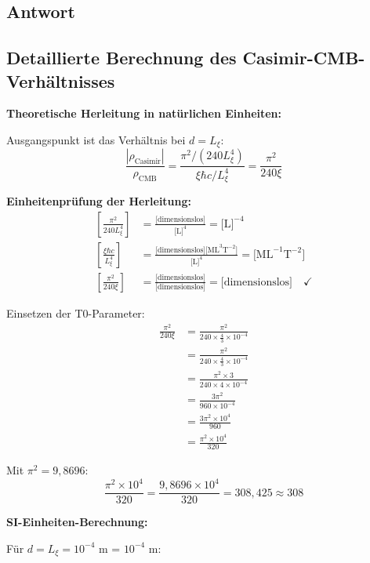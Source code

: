 \documentclass[12pt,a4paper]{article}
\theoremstyle{remark}
\newenvironment{answer}{\subsection*{Antwort}}{\vspace{1em}}
\begin{document}
\begin{answer}
	\subsection{Detaillierte Berechnung des Casimir-CMB-Verhältnisses}
	
	\textbf{Theoretische Herleitung in natürlichen Einheiten:}
	
	Ausgangspunkt ist das Verhältnis bei $d = L_\xi$:
	\begin{equation}
		\frac{|\rho_{\text{Casimir}}|}{\rho_{\text{CMB}}} = \frac{\pi^2/(240 L_\xi^4)}{\xi \hbar c/L_\xi^4} = \frac{\pi^2}{240 \xi}
	\end{equation}
	
	\begin{units}
		\textbf{Einheitenprüfung der Herleitung:}
		\begin{align}
			\left[\frac{\pi^2}{240 L_\xi^4}\right] &= \frac{\text{[dimensionslos]}}{\text{[L]}^4} = \text{[L]}^{-4} \\
			\left[\frac{\xi \hbar c}{L_\xi^4}\right] &= \frac{\text{[dimensionslos][ML}^3\text{T}^{-2}\text{]}}{\text{[L]}^4} = \text{[ML}^{-1}\text{T}^{-2}\text{]} \\
			\left[\frac{\pi^2}{240 \xi}\right] &= \frac{\text{[dimensionslos]}}{\text{[dimensionslos]}} = \text{[dimensionslos]} \quad \checkmark
		\end{align}
	\end{units}
	
	Einsetzen der T0-Parameter:
	\begin{align}
		\frac{\pi^2}{240 \xi} &= \frac{\pi^2}{240 \times \frac{4}{3} \times 10^{-4}} \\
		&= \frac{\pi^2}{240 \times \frac{4}{3} \times 10^{-4}} \\
		&= \frac{\pi^2 \times 3}{240 \times 4 \times 10^{-4}} \\
		&= \frac{3\pi^2}{960 \times 10^{-4}} \\
		&= \frac{3\pi^2 \times 10^4}{960} \\
		&= \frac{\pi^2 \times 10^4}{320}
	\end{align}
	
	Mit $\pi^2 = 9{,}8696$:
	\begin{equation}
		\frac{\pi^2 \times 10^4}{320} = \frac{9{,}8696 \times 10^4}{320} = 308{,}425 \approx 308
	\end{equation}
	
	\textbf{SI-Einheiten-Berechnung:}
	
	Für $d = L_\xi = 10^{-4}$ m = $10^{-4}$ m:
	

\end{answer}
\end{document}
